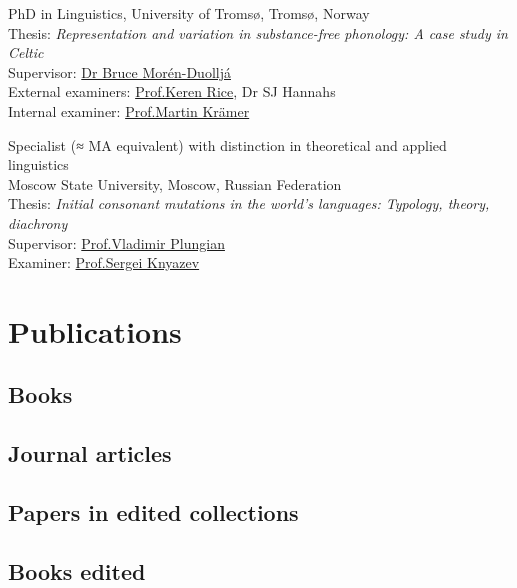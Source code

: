 \documentclass[a4paper,12pt]{article}
\newcommand\cvitem[1]{#1\par}
\newcommand{\block}[2]{\hspace{0pt}\marginpar{\plmarginyear{#1}}\cvitem{#2}}
\begin{document}
\block{2007--2012}{PhD in Linguistics, University of Tromsø, Tromsø, Norway\\
Thesis: \emph{Representation and variation in substance-free phonology: A case study in Celtic}\\
Supervisor: \href{https://arran.no/nord/?Article=110}{Dr Bruce Morén-Duolljá}\\
External examiners: \href{http://linguistics.utoronto.ca/people/faculty.html}{Prof.\@ Keren Rice}, Dr SJ Hannahs\\
Internal examiner: \href{https://uit.no/om/enhet/ansatte/person?p_document_id=41560\&p_dimension_id=210121}{Prof.\@ Martin Krämer}}
\block{2002--2007}{Specialist (≈ MA equivalent) with distinction in theoretical and applied linguistics\\
Moscow State University, Moscow, Russian Federation\\
Thesis: \emph{Initial consonant mutations in the world's languages: Typology,  theory, diachrony}\\
Supervisor: \href{https://iling-ran.ru/web/scholars/plungian}{Prof.\@ Vladimir Plungian}\\
Examiner: \href{http://www.philol.msu.ru/~ruslang/about/employee/knyazev.s.v/}{Prof.\@ Sergei Knyazev}}


\section{Publications}

\subsection*{Books}
\newrefsection[books]
\nocite{*}
\printbibliography[heading=none]

\nocite{*}

\subsection*{Journal articles}
\printbibliography[heading=none, notkeyword=future]

\subsection*{Papers in edited collections}
\newrefsection[chapters]
\nocite{*}
\printbibliography[heading=none]

\subsection*{Books edited}
\nocite{*}
\printbibliography[heading=none]
\end{document}

